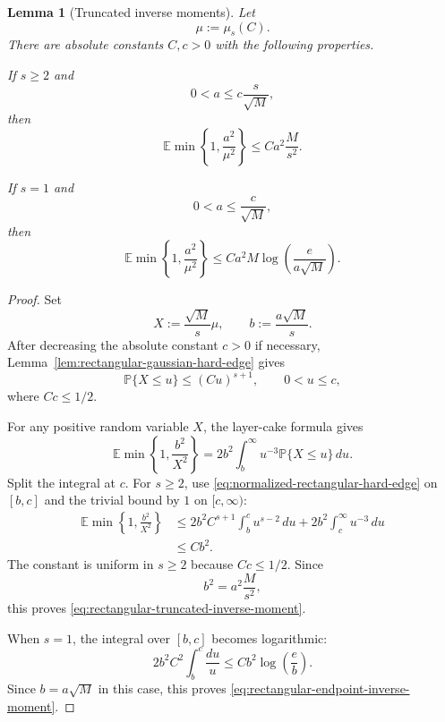 \documentclass[11pt]{article}
\newtheorem{lemma}{Lemma}
\newcommand{\Pbb}{\mathbb P}
\newcommand{\Ebb}{\mathbb E}
\newcommand{\1}{\mathbf 1}
\begin{document}
\begin{lemma}[Truncated inverse moments]
\label{lem:rectangular-truncated-inverse-moments}
Let
\[
        \mu:=\mu_s(C).
\]
There are absolute constants \(C,c>0\) with the following properties.

If \(s\ge2\) and
\[
        0<a\le c\frac{s}{\sqrt M},
\]
then
\begin{equation}
        \Ebb
        \min\left\{
        1,\frac{a^2}{\mu^2}
        \right\}
        \le
        C a^2\frac{M}{s^2}.
        \label{eq:rectangular-truncated-inverse-moment}
\end{equation}

If \(s=1\) and
\[
        0<a\le\frac{c}{\sqrt M},
\]
then
\begin{equation}
        \Ebb
        \min\left\{
        1,\frac{a^2}{\mu^2}
        \right\}
        \le
        C a^2M
        \log\left(\frac{e}{a\sqrt M}\right).
        \label{eq:rectangular-endpoint-inverse-moment}
\end{equation}
\end{lemma}

\begin{proof}
Set
\[
        X:=\frac{\sqrt M}{s}\mu,
        \qquad
        b:=\frac{a\sqrt M}{s}.
\]
After decreasing the absolute constant \(c>0\) if necessary,
Lemma~\ref{lem:rectangular-gaussian-hard-edge} gives
\begin{equation}
        \Pbb\{X\le u\}
        \le
        (Cu)^{s+1},
        \qquad
        0<u\le c,
        \label{eq:normalized-rectangular-hard-edge}
\end{equation}
where \(Cc\le1/2\).

For any positive random variable \(X\), the layer-cake formula gives
\begin{equation}
        \Ebb\min\left\{1,\frac{b^2}{X^2}\right\}
        =
        2b^2
        \int_b^\infty
        u^{-3}\Pbb\{X\le u\}\,du.
        \label{eq:truncated-inverse-layer-cake}
\end{equation}
Split the integral at \(c\).  For \(s\ge2\), use
\eqref{eq:normalized-rectangular-hard-edge} on \([b,c]\) and the trivial bound by \(1\)
on \([c,\infty)\):
\begin{align*}
        \Ebb\min\left\{1,\frac{b^2}{X^2}\right\}
        &\le
        2b^2C^{s+1}
        \int_b^c u^{s-2}\,du
        +
        2b^2\int_c^\infty u^{-3}\,du
\\
        &\le
        Cb^2.
\end{align*}
The constant is uniform in \(s\ge2\) because \(Cc\le1/2\).  Since
\[
        b^2=a^2\frac{M}{s^2},
\]
this proves \eqref{eq:rectangular-truncated-inverse-moment}.

When \(s=1\), the integral over \([b,c]\) becomes logarithmic:
\[
        2b^2C^2
        \int_b^c\frac{du}{u}
        \le
        Cb^2\log\left(\frac{e}{b}\right).
\]
Since \(b=a\sqrt M\) in this case, this proves
\eqref{eq:rectangular-endpoint-inverse-moment}.
\end{proof}
\end{document}
